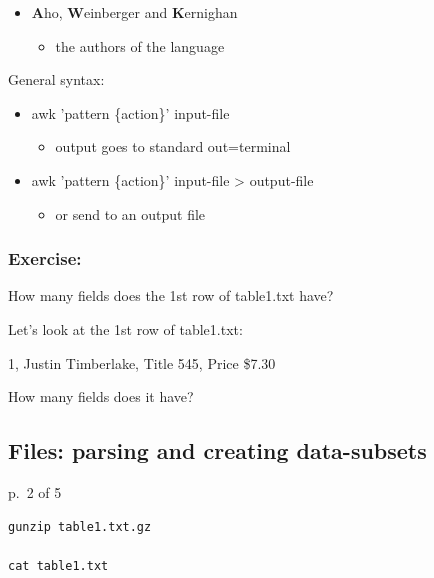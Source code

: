 \documentclass[
]{book}
\providecommand{\tightlist}{%
  \setlength{\itemsep}{0pt}\setlength{\parskip}{0pt}}
\begin{document}
\begin{itemize}
\tightlist
\item
  \textbf{A}ho, \textbf{W}einberger and \textbf{K}ernighan

  \begin{itemize}
  \tightlist
  \item
    the authors of the language
  \end{itemize}
\end{itemize}

General syntax:

\begin{itemize}
\tightlist
\item
  awk 'pattern \{action\}' input-file

  \begin{itemize}
  \tightlist
  \item
    output goes to standard out=terminal
  \end{itemize}
\item
  awk 'pattern \{action\}' input-file \textgreater{} output-file

  \begin{itemize}
  \tightlist
  \item
    or send to an output file
  \end{itemize}
\end{itemize}

\hypertarget{exercise}{%
\subsubsection*{Exercise:}\label{exercise}}

How many fields does the 1st row of table1.txt have?

Let's look at the 1st row of table1.txt:

1, Justin Timberlake, Title 545, Price \$7.30

How many fields does it have?

\hypertarget{files-parsing-and-creating-data-subsets-1}{%
\subsection{Files: parsing and creating data-subsets}\label{files-parsing-and-creating-data-subsets-1}}

p.~2 of 5

\begin{verbatim}
gunzip table1.txt.gz

cat table1.txt
\end{verbatim}
\end{document}
